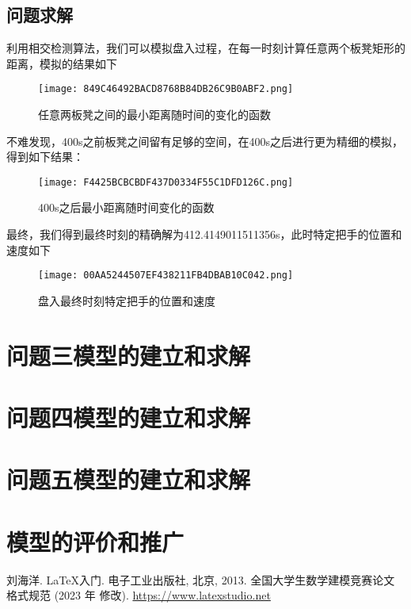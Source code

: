 \documentclass[withoutpreface,bwprint]{cumcmthesis} %
\begin{document}
\subsection{问题求解}

利用相交检测算法，我们可以模拟盘入过程，在每一时刻计算任意两个板凳矩形的距离，模拟的结果如下

\begin{figure}[H]  
    \centering
    \texttt{[image: 849C46492BACD8768B84DB26C9B0ABF2.png]} %
    \caption{任意两板凳之间的最小距离随时间的变化的函数}
\end{figure}

不难发现，400s之前板凳之间留有足够的空间，在400s之后进行更为精细的模拟，得到如下结果：

\begin{figure}[H]
    \centering
    \texttt{[image: F4425BCBCBDF437D0334F55C1DFD126C.png]}
    \caption{400s之后最小距离随时间变化的函数}
\end{figure}

最终，我们得到最终时刻的精确解为412.4149011511356s，此时特定把手的位置和速度如下

\begin{figure}[H]
    \centering
    \texttt{[image: 00AA5244507EF438211FB4DBAB10C042.png]}
    \caption{盘入最终时刻特定把手的位置和速度}
\end{figure}


\section{问题三模型的建立和求解}

\section{问题四模型的建立和求解}

\section{问题五模型的建立和求解}

\section{模型的评价和推广}


\begin{thebibliography}{9}%
    刘海洋.
    \newblock \LaTeX {}入门\allowbreak[J].
    \newblock 电子工业出版社, 北京, 2013.
    全国大学生数学建模竞赛论文格式规范 (2023 年 修改).
     \url{https://www.latexstudio.net}
\end{thebibliography}

\newpage
\begin{appendices}

\end{appendices}
\end{document}
